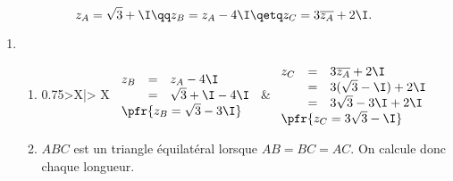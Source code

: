 \documentclass[10pt,french]{book}
\begin{document}
{\small
\exo \[z_A = \sqrt 3 + \I \qq z_B = z_A - 4\I \qetq z_C = 3 \overline{z_A} + 2\I.\]

\begin{enumerate}
\item \begin{enumerate}
    \item\strut
    
    \begin{center}
        \begin{tabularx}{0.75\linewidth}{>\centering X|>{\centering\arraybackslash} X}
            $\begin{array}{rcl}
                z_B & = & z_A - 4\I \\
                &=& \sqrt 3 + \I - 4 \I \\
                \multicolumn{3}{l}{\pfr{z_B = \sqrt 3 - 3\I}}
            \end{array}$ &
            $\begin{array}{rcl}
                z_C & = & 3\overline{z_A} + 2\I \\
                &=& 3(\sqrt 3 - \I) + 2\I \\
                &=&3\sqrt 3 - 3\I + 2\I \\
                \multicolumn{3}{l}{\pfr{z_C = 3\sqrt 3 - \I}}
            \end{array}$ 
        \end{tabularx}
    \end{center}
    
    \item $ABC$ est un triangle équilatéral lorsque $AB = BC = AC$. On calcule donc chaque longueur.\medskip


\end{enumerate}
\end{enumerate}}
\end{document}
